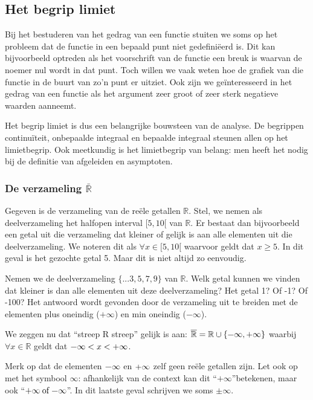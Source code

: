 \subsection{Het begrip limiet}

Bij het bestuderen van het gedrag van een functie stuiten we soms
op het probleem dat de functie in een bepaald punt niet gedefini\"eerd
is. Dit kan bijvoorbeeld optreden als het voorschrift van de functie
een breuk is waarvan de noemer nul wordt in dat punt. Toch willen
we vaak weten hoe de grafiek van die functie in de buurt van zo'n
punt er uitziet. Ook zijn we ge\"interesseerd in het gedrag van een
functie als het argument zeer groot of zeer sterk negatieve waarden
aanneemt.

Het begrip limiet is dus een belangrijke bouwsteen van de
analyse. De begrippen continu\"iteit, onbepaalde integraal en bepaalde
integraal steunen allen op het limietbegrip. Ook meetkundig is het
limietbegrip van belang: men heeft het nodig bij de definitie van
afgeleiden en asymptoten.


\subsubsection{De verzameling $\bar{\mathbb{R}}$}

Gegeven is de verzameling van de re\"ele getallen $\mathbb{R}$. Stel,
we nemen als deelverzameling het halfopen interval $[5,10[$ van $\mathbb{R}$.
Er bestaat dan bijvoorbeeld een getal uit die verzameling dat kleiner
of gelijk is aan alle elementen uit die deelverzameling. We noteren
dit als $\forall x\in[5,10[$ waarvoor geldt dat $x\ge5$. In dit
geval is het gezochte getal 5. Maar dit is niet altijd zo eenvoudig.




Nemen we de deelverzameling $\{...3,5,7,9\}$ van $\mathbb{R}$.
Welk getal kunnen we vinden dat kleiner is dan alle elementen uit
deze deelverzameling? Het getal 1? Of -1? Of -100? Het antwoord wordt
gevonden door de verzameling uit te breiden met de elementen plus
oneindig ($+\infty$) en min oneindig ($-\infty$).




We zeggen nu dat ``streep R streep'' gelijk is aan: $\overline{\mathbb{R}}=\mathbb{R}\cup\{\text{\textminus\ensuremath{\infty}},+\text{\ensuremath{\infty}}\}$
waarbij $\forall x\in\mathbb{R}$ geldt dat $\text{\textminus\ensuremath{\infty}}<x<+\text{\ensuremath{\infty}}$.




Merk op dat de elementen $\text{\textminus\ensuremath{\infty}}$
en $+\text{\ensuremath{\infty}}$ zelf geen re\"ele getallen zijn. Let
ook op met het symbool $\infty$: afhankelijk van de context kan dit
\textquotedblleft$+\infty$\textquotedblright betekenen, maar ook \textquotedblleft$+\infty\:\mathrm{of}\:\text{\textminus\ensuremath{\infty}}$\textquotedblright.
In dit laatste geval schrijven we soms $\pm\infty$.


